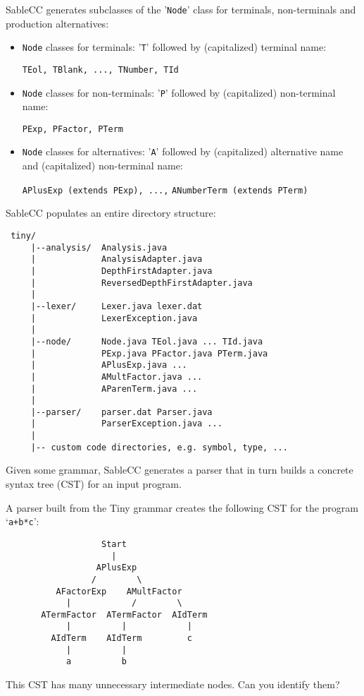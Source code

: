 \begin{slide*}
SableCC generates subclasses of the '{\tt Node}' class for terminals, 
non-terminals and production alternatives:
\begin{itemize}
\item {\tt Node} classes for terminals: '{\tt T}' followed by
  (capitalized) terminal name:

\verb+TEol, TBlank, ..., TNumber, TId+

\item {\tt Node} classes for non-terminals: '{\tt P}' followed by
  (capitalized) non-terminal name: 

\verb+PExp, PFactor, PTerm+

\item {\tt Node} classes for alternatives: '{\tt A}' followed by
  (capitalized) alternative name and (capitalized) non-terminal name:

\verb+APlusExp (extends PExp), ...,+
\verb+ANumberTerm (extends PTerm)+
\end{itemize}
\vfil
\end{slide*}

\begin{slide*}
SableCC populates an entire directory structure:
\begin{scriptsize}
\begin{verbatim}
 tiny/
     |--analysis/  Analysis.java 
     |             AnalysisAdapter.java 
     |             DepthFirstAdapter.java
     |             ReversedDepthFirstAdapter.java
     |
     |--lexer/     Lexer.java lexer.dat
     |             LexerException.java
     |
     |--node/      Node.java TEol.java ... TId.java
     |             PExp.java PFactor.java PTerm.java
     |             APlusExp.java ... 
     |             AMultFactor.java ... 
     |             AParenTerm.java ...
     |
     |--parser/    parser.dat Parser.java 
     |             ParserException.java ...
     |
     |-- custom code directories, e.g. symbol, type, ...
\end{verbatim}
\end{scriptsize}
\vfil
\end{slide*}

\begin{slide*}
Given some grammar, SableCC generates a parser that in turn builds a
concrete syntax tree (CST) for an input program.

A parser built from the Tiny grammar creates the following CST for the program
`{\tt a+b*c}':

\begin{scriptsize}
\begin{verbatim}
                   Start
                     |
                  APlusExp
                 /        \
          AFactorExp    AMultFactor
            |            /        \
       ATermFactor  ATermFactor  AIdTerm
            |          |            |
         AIdTerm    AIdTerm         c
            |          |
            a          b
\end{verbatim}
\end{scriptsize}

This CST has many unnecessary intermediate nodes.  Can you identify
them?
\vfil
\end{slide*}

